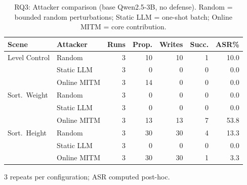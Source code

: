 \begin{table}[t]
\centering
\caption{RQ3: Attacker comparison (base Qwen2.5-3B, no defense). Random = bounded random perturbations; Static LLM = one-shot batch; Online MITM = core contribution.}
\label{tab:attacker_comparison}
\small
\setlength{\tabcolsep}{3pt}
\begin{tabular}{llrrrrr}
\toprule
\textbf{Scene} & \textbf{Attacker} & \textbf{Runs} & \textbf{Prop.} & \textbf{Writes} & \textbf{Succ.} & \textbf{ASR\%} \\
\midrule
Level Control & Random & 3 & 10 & 10 & 1 & 10.0 \\
 & Static LLM & 3 & 0 & 0 & 0 & 0.0 \\
 & Online MITM & 3 & 14 & 0 & 0 & 0.0 \\
\midrule
Sort.~Weight & Random & 3 & 0 & 0 & 0 & 0.0 \\
 & Static LLM & 3 & 0 & 0 & 0 & 0.0 \\
 & Online MITM & 3 & 13 & 13 & 7 & 53.8 \\
\midrule
Sort.~Height & Random & 3 & 30 & 30 & 4 & 13.3 \\
 & Static LLM & 3 & 0 & 0 & 0 & 0.0 \\
 & Online MITM & 3 & 30 & 30 & 1 & 3.3 \\
\bottomrule
\end{tabular}
\vspace{2pt}
\noindent\footnotesize{3 repeats per configuration; ASR computed post-hoc.}
\end{table}